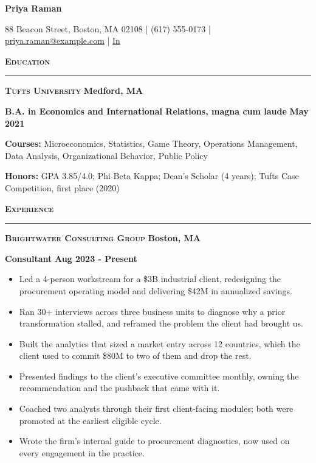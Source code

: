 \documentclass{article}
\newcommand{\vs}{\vspace{0.3cm}}
\begin{document}
\begin{center}
	\textbf{\LARGE Priya Raman}

	88 Beacon Street, Boston, MA 02108 | (617) 555-0173 | \href{mailto:priya.raman@example.com}{priya.raman@example.com} | \href{https://www.linkedin.com/in/priyaraman/}{In}
\end{center}

\noindent \textbf{\textsc{\large Education}}

\noindent \rule[3pt]{\textwidth}{1pt}

\noindent \textbf{\textsc{Tufts University}} \hfill \textbf{Medford, MA}

\noindent \textbf{B.A. in Economics and International Relations, magna cum laude} \hfill \textbf{May 2021}

\noindent \textbf{Courses:} Microeconomics, Statistics, Game Theory, Operations Management, Data Analysis, Organizational Behavior, Public Policy

\noindent \textbf{Honors:} GPA 3.85/4.0; Phi Beta Kappa; Dean's Scholar (4 years); Tufts Case Competition, first place (2020)
\vs

\noindent \textbf{\textsc{\large Experience}}

\noindent \rule[3pt]{\textwidth}{1pt}

\noindent \textbf{\textsc{Brightwater Consulting Group}} \hfill \textbf{Boston, MA}

\noindent \textbf{Consultant} \hfill \textbf{Aug 2023 - Present}
\begin{itemize}
	\item Led a 4-person workstream for a \$3B industrial client, redesigning the procurement operating model and delivering \$42M in annualized savings.
	\item Ran 30+ interviews across three business units to diagnose why a prior transformation stalled, and reframed the problem the client had brought us.
	\item Built the analytics that sized a market entry across 12 countries, which the client used to commit \$80M to two of them and drop the rest.
	\item Presented findings to the client's executive committee monthly, owning the recommendation and the pushback that came with it.
	\item Coached two analysts through their first client-facing modules; both were promoted at the earliest eligible cycle.
	\item Wrote the firm's internal guide to procurement diagnostics, now used on every engagement in the practice.
\end{itemize}
\end{document}
